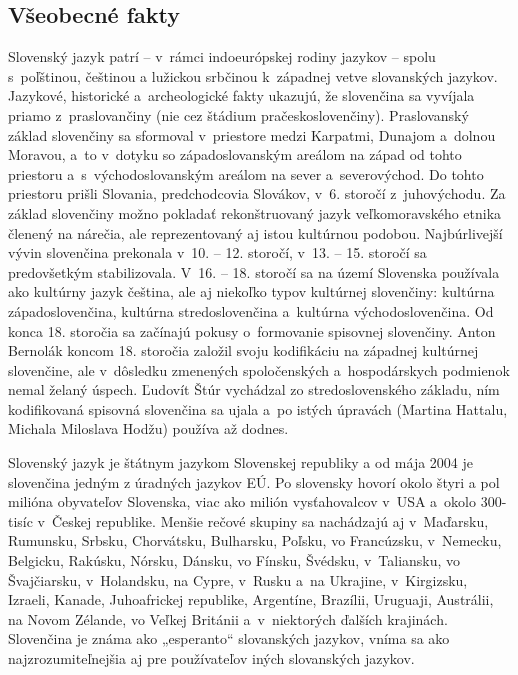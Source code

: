 \clearpage


\begin{multicols}{2}
\subsection{Všeobecné fakty}
Slovenský jazyk patrí – v~rámci indoeurópskej rodiny jazykov –
spolu s~poľštinou, češtinou a lužickou srbčinou k~západnej vetve
slovanských jazykov. Jazykové, historické a~archeologické fakty
ukazujú, že slovenčina sa vyvíjala priamo z~praslovančiny (nie cez
štádium pračeskoslovenčiny). Praslovanský základ slovenčiny sa
sformoval v~priestore medzi Karpatmi, Dunajom a~dolnou Moravou, a~to
v~dotyku so západoslovanským areálom na západ od tohto priestoru
a~s~východoslovanským areálom na sever a~severovýchod. Do tohto
priestoru prišli Slovania, predchodcovia Slovákov, v~6. storočí
z~juhovýchodu. Za základ slovenčiny možno pokladať rekonštruovaný
jazyk veľkomoravského etnika členený na nárečia, ale reprezentovaný aj istou kultúrnou podobou. Najbúrlivejší vývin
slovenčina prekonala v~10. – 12. storočí, v~13. – 15. storočí
sa predovšetkým stabilizovala. V~16. – 18. storočí sa na území
Slovenska používala ako kultúrny jazyk čeština, ale aj niekoľko
typov kultúrnej slovenčiny: kultúrna západoslovenčina, kultúrna
stredoslovenčina a~kultúrna východoslovenčina. Od konca 18.
storočia sa začínajú pokusy o~formovanie spisovnej slovenčiny.
Anton Bernolák koncom 18. storočia založil svoju kodifikáciu na
západnej kultúrnej slovenčine, ale v~dôsledku zmenených
spoločenských a~hospodárskych podmienok nemal želaný úspech.
Ľudovít Štúr vychádzal zo stredoslovenského základu, ním kodifikovaná spisovná slovenčina sa ujala a~po istých úpravách (Martina
Hattalu, Michala Miloslava Hodžu) používa až dodnes.

Slovenský jazyk je štátnym jazykom Slovenskej republiky a od mája 2004 je slovenčina jedným z úradných jazykov EÚ. Po slovensky hovorí okolo štyri a pol milióna obyvateľov Slovenska, viac ako milión vysťahovalcov v~USA a~okolo 300-tisíc v~Českej republike. Menšie rečové skupiny sa nachádzajú aj v~Maďarsku, Rumunsku, Srbsku, Chorvátsku, Bulharsku, Poľsku, vo Francúzsku, v~Nemecku, Belgicku, Rakúsku, Nórsku, Dánsku, vo Fínsku, Švédsku, v~Taliansku, vo Švajčiarsku, v~Holandsku, na Cypre, v~Rusku a~na Ukrajine, v~Kirgizsku, Izraeli, Kanade, Juhoafrickej republike, Argentíne, Brazílii, Uruguaji, Austrálii, na Novom Zélande, vo Veľkej Británii a~v~niektorých ďalších krajinách. Slovenčina je známa ako „esperanto“ slovanských jazykov, vníma sa ako najzrozumiteľnejšia aj pre používateľov iných slovanských jazykov.


\end{multicols}
